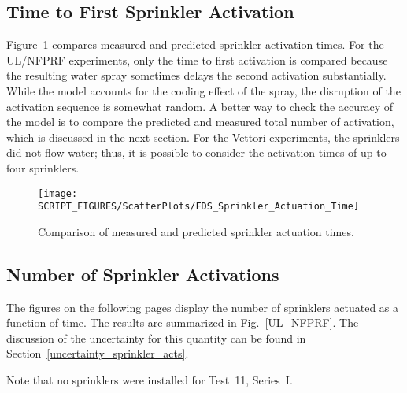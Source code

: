 \subsection{Time to First Sprinkler Activation}
\label{Sprinkler Activation Time}

Figure~\ref{Sprinkler_Activation_Times} compares measured and predicted sprinkler activation times. For the UL/NFPRF experiments, only the time to first activation is compared because the resulting water spray sometimes delays the second activation substantially. While the model accounts for the cooling effect of the spray, the disruption of the activation sequence is somewhat random. A better way to check the accuracy of the model is to compare the predicted and measured total number of activation, which is discussed in the next section. For the Vettori experiments, the sprinklers did not flow water; thus, it is possible to consider the activation times of up to four sprinklers.

\begin{figure}[h]
\begin{center}
\texttt{[image: SCRIPT\_FIGURES/ScatterPlots/FDS\_Sprinkler\_Actuation\_Time]}
\end{center}
\caption[Comparison of measured and predicted sprinkler actuation times]{Comparison of measured and predicted sprinkler actuation times.}
\label{Sprinkler_Activation_Times}
\end{figure}


\clearpage

\subsection{Number of Sprinkler Activations}
\label{UL_NFPRF:Results}
\label{Sprinkler Actuations}

The figures on the following pages display the number of sprinklers actuated as a function of time. The results are summarized in Fig.~\ref{UL_NFPRF}. The discussion of the uncertainty for this quantity can be found in Section~\ref{uncertainty_sprinkler_acts}.

Note that no sprinklers were installed for Test~11, Series~I.

\newpage

